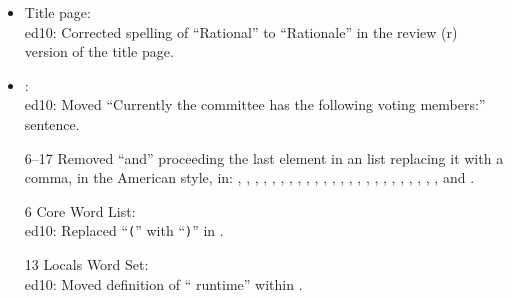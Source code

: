 	\begin{itemize}
	\item Title page: \\
		\textsf{ed10}: Corrected spelling of ``Rational'' to ``Rationale''
			in the review (r) version of the title page.

	\item {}: \\
		\textsf{ed10}: Moved ``Currently the committee has the
			following voting members:'' sentence.

	\item[6--17] Removed ``and'' proceeding the last element in an list
		replacing it with a comma, in the American style, in:
			,
			,
			,
			, \linebreak
			,
			,
			,
			, 
			,
			,
			,
			,
			, \linebreak
			,
			,
			, \linebreak
			,
			,
			, \linebreak
			,
			,
			,
			, \linebreak
			,
			 and
			.
	
	\item[6] Core Word List: \\
		\textsf{ed10}: Replaced ``\texttt{(}'' with ``\texttt{)}'' in
			.

	\item[13] Locals Word Set: \\
		\textsf{ed10}: Moved definition of ``  runtime''
		within .
	\end{itemize}


